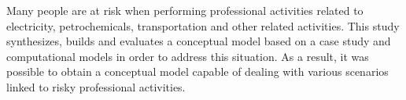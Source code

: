 Many people are at risk when performing professional activities related to electricity, petrochemicals, transportation and other related activities. This study synthesizes, builds and evaluates a conceptual model based on a case study and computational models in order to address this situation. As a result, it was possible to obtain a conceptual model capable of dealing with various scenarios linked to risky professional activities.